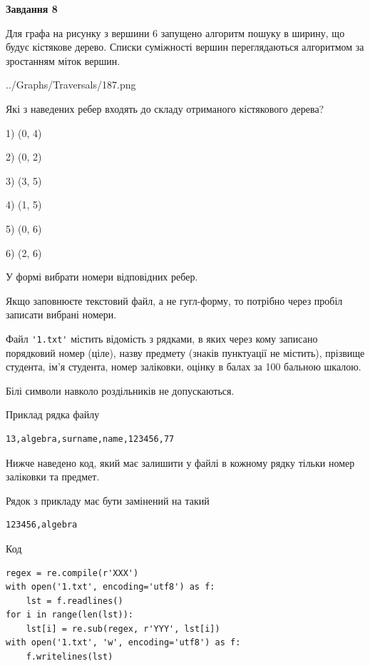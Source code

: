 \documentclass[12pt, ukrainian]{article}
\def\code#1{\Verb!#1!}
\begin{document}
{\begin {large}
{\begin {center}\textbf{Завдання 8}\end {center}}\par
Для графа на рисунку з вершини 6 запущено алгоритм пошуку в ширину, що будує кістякове дерево. Списки суміжності вершин переглядаються алгоритмом за зростанням міток вершин.\par
\begin{center}
	{../Graphs/Traversals/187.png}
\end{center}
\par Які з наведених ребер входять до складу отриманого кістякового дерева?\par
1) (0, 4)\par
2) (0, 2)\par
3) (3, 5)\par
4) (1, 5)\par
5) (0, 6)\par
6) (2, 6)\par
{\vskip 15pt} У формі вибрати номери відповідних ребер.


Якщо заповнюєте текстовий файл, а не гугл-форму, то потрібно через пробіл записа\-ти вибрані номери.\par
\newpage


Файл \code{'1.txt'} містить відомість з рядками, в яких через кому записано поряд\-ковий номер (ціле), назву предмету (знаків пунктуації не містить), прізвище студента, ім'я студента, номер заліковки, оцінку в балах за 100 бальною шкалою.

Білі символи навколо роздільників не допускаються.

Приклад рядка файлу



\begin{verbatim}
13,algebra,surname,name,123456,77
\end{verbatim}


Нижче наведено код, який має залишити у файлі в кожному рядку тільки номер заліковки та предмет.

Рядок з прикладу має бути замінений на такий



\begin{verbatim}
123456,algebra
\end{verbatim}




Код



\begin{verbatim}
regex = re.compile(r'XXX')
with open('1.txt', encoding='utf8') as f:
    lst = f.readlines()
for i in range(len(lst)):
    lst[i] = re.sub(regex, r'YYY', lst[i])
with open('1.txt', 'w', encoding='utf8') as f:
    f.writelines(lst)
\end{verbatim}







\end{large}}
\end{document}
